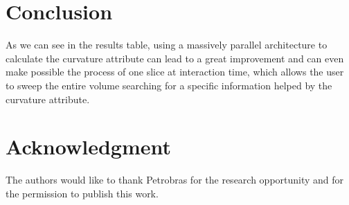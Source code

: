 \documentclass[conference]{IEEEtran}
\begin{document}
\section{Conclusion}



As we can see in the results table, using a massively parallel architecture to calculate the curvature attribute can lead to a great improvement and can even make possible the process of one slice at interaction time, which allows the user to sweep the entire volume searching for a specific information helped by the curvature attribute.



\section*{Acknowledgment}


The authors would like to thank Petrobras for the research opportunity and for the permission to publish this work.







\end{document}
